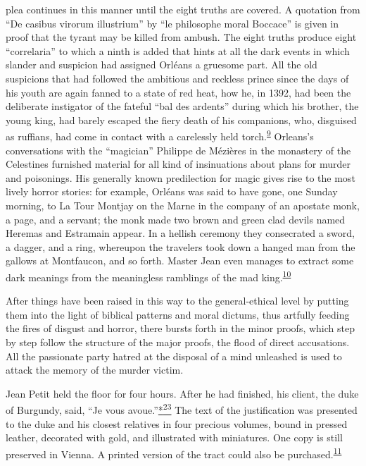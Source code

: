 plea continues in this manner until the eight truths are covered. A
quotation from ``De casibus virorum illustrium'' by ``le philosophe
moral Boccace'' is given in proof that the tyrant may be killed from
ambush. The eight truths produce eight ``correlaria'' to which a ninth
is added that hints at all the dark events in which slander and
suspicion had assigned Orléans a gruesome part. All the old suspicions
that had followed the ambitious and reckless prince since the days of
his youth are again fanned to a state of red heat, how he, in 1392, had
been the deliberate instigator of the fateful ``bal des ardents'' during
which his brother, the young king, had barely escaped the fiery death of
his companions, who, disguised as ruffians, had come in contact with a
carelessly held
torch.\textsuperscript{\protect\hypertarget{18_Chapter_Eleven__THE_FORMS_OF_THO.xhtmlux5cux23id_614}{\protect\hyperlink{23_NOTES.xhtmlux5cux23id_615}{9}}}
Orleans's conversations with the ``magician'' Philippe de Mézières in
the monastery of the Celestines furnished material for all kind of
insinuations about plans for murder and poisonings. His generally known
predilection for magic gives rise to the most lively horror stories: for
example, Orléans was said to have gone, one Sunday morning, to La Tour
Montjay on the Marne in the company of an apostate monk, a page, and a
servant; the monk made two brown and green clad devils named Heremas and
Estramain appear. In a hellish ceremony they consecrated a sword, a
dagger, and a ring, whereupon the travelers took down a hanged man from
the gallows at Montfaucon, and so forth. Master Jean even manages to
extract
\protect\hypertarget{18_Chapter_Eleven__THE_FORMS_OF_THO.xhtmlux5cux23page_273}{}{}some
dark meanings from the meaningless ramblings of the mad
king.\textsuperscript{\protect\hypertarget{18_Chapter_Eleven__THE_FORMS_OF_THO.xhtmlux5cux23id_612}{\protect\hyperlink{23_NOTES.xhtmlux5cux23id_613}{10}}}

After things have been raised in this way to the general-ethical level
by putting them into the light of biblical patterns and moral dictums,
thus artfully feeding the fires of disgust and horror, there bursts
forth in the minor proofs, which step by step follow the structure of
the major proofs, the flood of direct accusations. All the passionate
party hatred at the disposal of a mind unleashed is used to attack the
memory of the murder victim.

Jean Petit held the floor for four hours. After he had finished, his
client, the duke of Burgundy, said, ``Je vous
avoue.''\protect\hypertarget{18_Chapter_Eleven__THE_FORMS_OF_THO.xhtmlux5cux23id_2343}{\protect\hyperlink{23_NOTES.xhtmlux5cux23id_2344}{*\textsuperscript{23}}}
The text of the justification was presented to the duke and his closest
relatives in four precious volumes, bound in pressed leather, decorated
with gold, and illustrated with miniatures. One copy is still preserved
in Vienna. A printed version of the tract could also be
purchased.\textsuperscript{\protect\hypertarget{18_Chapter_Eleven__THE_FORMS_OF_THO.xhtmlux5cux23id_610}{\protect\hyperlink{23_NOTES.xhtmlux5cux23id_611}{11}}}

